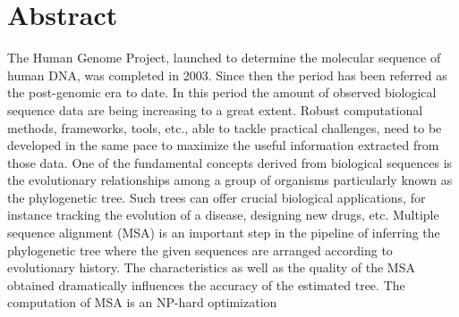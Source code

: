 \chapter*{Abstract}
The Human Genome Project, launched to determine the molecular sequence of human DNA, was completed in 2003. Since then the period has been referred as the post-genomic era to date. In this period the amount of observed biological sequence data are being increasing to a great extent. Robust computational methods, frameworks, tools, etc., able to tackle practical challenges, need to be developed in the same pace to maximize the useful information extracted from those data. One of the fundamental concepts derived from biological sequences is the evolutionary relationships among a group of organisms particularly known as the phylogenetic tree. Such trees can offer crucial biological applications, for instance tracking the evolution of a disease, designing new drugs, etc. Multiple sequence alignment (MSA) is an important step in the pipeline of inferring the phylogenetic tree where the given sequences are arranged according to evolutionary history. The characteristics as well as the quality of the MSA obtained dramatically influences the accuracy of the estimated tree. The computation of MSA is an NP-hard optimization 







